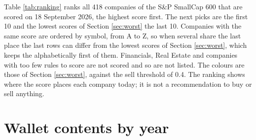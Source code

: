 \documentclass[11pt,a4paper]{article}
\begin{document}
Table \ref{tab:ranking} ranks all 418 companies of the S\&P SmallCap 600 that are scored on 18 September 2026, the highest score first. The next picks are the first 10 and the lowest scores of Section \ref{sec:worst} the last 10. Companies with the same score are ordered by symbol, from A to Z, so when several share the last place the last rows can differ from the lowest scores of Section \ref{sec:worst}, which keeps the alphabetically first of them. Financials, Real Estate and companies with too few rules to score are not scored and so are not listed. The colours are those of Section \ref{sec:worst}, against the sell threshold of 0.4. The ranking shows where the score places each company today; it is not a recommendation to buy or sell anything.

\section{Wallet contents by year}
\label{app:contents}
\end{document}
